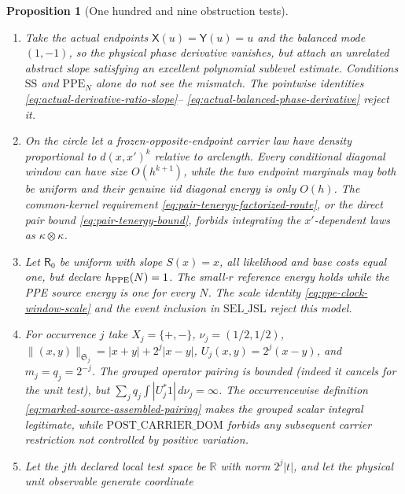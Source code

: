 \documentclass[11pt]{article}
\newtheorem{proposition}[theorem]{Proposition}
\begin{document}
\begin{proposition}[One hundred and nine obstruction tests]
\begin{enumerate}[label=\textup{(T\arabic*)}]
      continuous bump $\Phi_s$ supported in $(s,3s)$ with
      $\Phi_s(2s)=1$ but pointwise limit zero.  Uniform sup norm and
      branchwise pointwise convergence do not imply convergence of the
      pairing.  The common off-boundary BL modulus and convergence in
      \eqref{eq:moving-face-test-BL-convergence} reject this model.
\item Take the actual endpoints $\mathsf X(u)=\mathsf Y(u)=u$ and the
      balanced mode $(1,-1)$, so the physical phase derivative vanishes,
      but attach an unrelated abstract slope satisfying an excellent
      polynomial sublevel estimate.  Conditions $\mathrm{SS}$ and
      $\mathrm{PPE}_{N}$ alone do not see the mismatch.  The pointwise
      identities \eqref{eq:actual-derivative-ratio-slope}--
      \eqref{eq:actual-balanced-phase-derivative} reject it.
\item On the circle let a frozen-opposite-endpoint carrier law have density
      proportional to $d(x,x')^k$ relative to arclength.  Every conditional
      diagonal window can have size $O(h^{k+1})$, while the two endpoint
      marginals may both be uniform and their genuine iid diagonal energy is
      only $O(h)$.  The common-kernel requirement
      \eqref{eq:pair-tenergy-factorized-route}, or the direct pair bound
      \eqref{eq:pair-tenergy-bound}, forbids integrating the
      $x'$-dependent laws as $\kappa\otimes\kappa$.
\item Let $\mathsf R_0$ be uniform with slope $S(x)=x$, all likelihood and
      base costs equal one, but declare $h_{\rm PPE}(N)=1$.  The small-$r$
      reference energy holds while the PPE source energy is one for every
      $N$.  The scale identity \eqref{eq:ppe-clock-window-scale} and the
      event inclusion in $\mathrm{SEL\_JSL}$ reject this model.
\item For occurrence $j$ take $X_j=\{+,-\}$,
      $\nu_j=(1/2,1/2)$,
      $\|(x,y)\|_{\mathfrak S_j}=|x+y|+2^j|x-y|$,
      $U_j(x,y)=2^j(x-y)$, and $m_j=q_j=2^{-j}$.  The grouped operator
      pairing is bounded (indeed it cancels for the unit test), but
      $\sum_jq_j\int|U_j^*1|\,d\nu_j=\infty$.  The occurrencewise definition
      \eqref{eq:marked-source-assembled-pairing} makes the grouped scalar
      integral legitimate, while $\mathrm{POST\_CARRIER\_DOM}$ forbids any
      subsequent carrier restriction not controlled by positive variation.
\item Let the $j$th declared local test space be $\mathbb R$ with norm
      $2^j|t|$, and let the physical unit observable generate coordinate

\end{enumerate}
\end{proposition}
\end{document}
